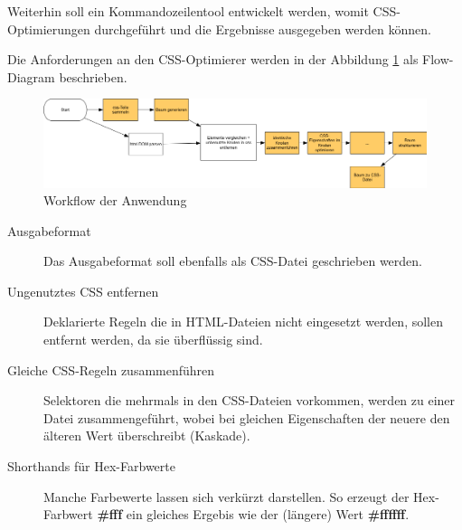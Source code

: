Weiterhin soll ein Kommandozeilentool entwickelt werden, womit CSS-Optimierungen durchgeführt und die Ergebnisse ausgegeben werden können. 

Die Anforderungen an den CSS-Optimierer werden in der Abbildung \ref{app-workflow} als Flow-Diagram beschrieben. 

\begin{figure}[h!]
	\begin{center}
		\includegraphics[width=1.0\textwidth]{img/app-workflow.png}
		\caption{Workflow der Anwendung}
		\label{app-workflow}	
	\end{center}
\end{figure}

\begin{description}
    \item[Ausgabeformat] Das Ausgabeformat soll ebenfalls als CSS-Datei geschrieben werden.
    
    \item[Ungenutztes CSS entfernen] Deklarierte Regeln die in HTML-Dateien nicht eingesetzt werden, sollen entfernt werden, da sie überflüssig sind.
    
    \item[Gleiche CSS-Regeln zusammenführen] Selektoren die mehrmals in den CSS-Dateien vorkommen, werden zu einer Datei zusammengeführt, wobei bei gleichen Eigenschaften der neuere den älteren Wert überschreibt (Kaskade).
    
    \item[Shorthands für Hex-Farbwerte] Manche Farbewerte lassen sich verkürzt darstellen. So erzeugt der Hex-Farbwert \textbf{\#fff} ein gleiches Ergebis wie der (längere) Wert \textbf{\#ffffff}. 
    
    \item[]
\end{description}
